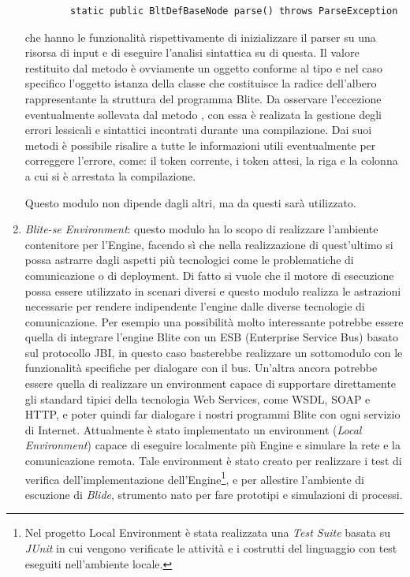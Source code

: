 \begin{enumerate}
\begin{lstlisting}
		static public BltDefBaseNode parse() throws ParseException 
  	\end{lstlisting}
	che hanno le funzionalità rispettivamente di inizializzare il parser su una
	risorsa di input e di eseguire l'analisi sintattica su di questa. Il valore
	restituito dal metodo  è ovviamente un oggetto conforme al
	tipo  e nel caso specifico l'oggetto istanza della classe
	 che costituisce la radice dell'albero
	rappresentante la struttura del programma Blite. Da osservare l'eccezione
	 eventualmente sollevata dal metodo , con
	essa è realizata la gestione degli errori lessicali e sintattici incontrati
	durante una compilazione. Dai suoi metodi è possibile risalire a tutte le
	informazioni utili eventualmente per correggere l'errore, come: il token
	corrente, i token attesi, la riga e la colonna a cui si è arrestata la
	compilazione.
	
	Questo modulo non dipende dagli altri, ma da questi sarà utilizzato.
	
  \item \emph{Blite-se Environment}: questo modulo ha lo scopo di realizzare
  l'ambiente contenitore per l'Engine, facendo sì che nella realizzazione di
  quest'ultimo si possa astrarre dagli aspetti più tecnologici come le
  problematiche di comunicazione o di deployment. Di fatto si vuole
  che il motore di esecuzione possa essere utilizzato in scenari
  diversi e questo modulo realizza le astrazioni necessarie per rendere
  indipendente l'engine dalle diverse tecnologie di comunicazione. Per esempio
  una possibilità molto interessante potrebbe essere quella di integrare
  l'engine Blite con un ESB (Enterprise Service Bus) basato sul protocollo JBI,
  in questo caso basterebbe realizzare un sottomodulo con le funzionalità
  specifiche per dialogare con il bus. Un'altra ancora potrebbe essere
  quella di realizzare un environment capace di supportare direttamente gli
  standard tipici della tecnologia Web Services, come WSDL, SOAP e HTTP, e
  poter quindi far dialogare i nostri programmi Blite con ogni servizio di Internet. 
  Attualmente è stato implementato un environment (\emph{Local Environment})
  capace di eseguire localmente più Engine e simulare
  la rete e la comunicazione remota. Tale environment è stato creato per 
  realizzare i test di verifica dell'implementazione dell'Engine\footnote{Nel
  progetto Local Environment è stata realizzata una \emph{Test Suite} basata su \emph{JUnit}
  in cui vengono verificate le attività e i costrutti del linguaggio con
  test eseguiti nell'ambiente locale.}, e per allestire l'ambiente di escuzione
  di \emph{Blide}, strumento nato per fare prototipi e simulazioni di processi.
  

\end{enumerate}
